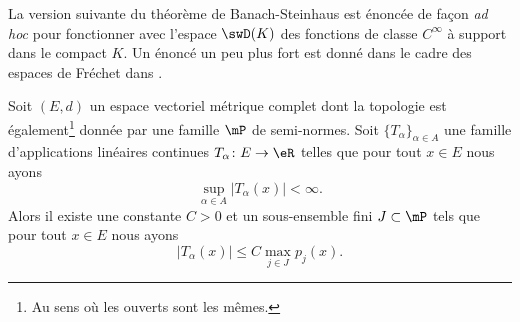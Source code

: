 La version suivante du théorème de Banach-Steinhaus est énoncée de façon \emph{ad hoc} pour fonctionner avec l'espace \( \swD(K)\) des fonctions de classe \(  C^{\infty}\) à support dans le compact \( K\). Un énoncé un peu plus fort est donné dans le cadre des espaces de Fréchet dans \cite{TQSWRiz}.
\begin{theorem}  \label{ThoNBrmGIg}
    Soit \( (E,d)\) un espace vectoriel métrique complet dont la topologie est également\footnote{Au sens où les ouverts sont les mêmes.} donnée par une famille \( \mP\) de semi-normes. Soit \( \{ T_{\alpha} \}_{\alpha\in A}\) une famille d'applications linéaires continues \( T_{\alpha}\colon E\to \eR\) telles que pour tout \( x\in E\) nous ayons
    \begin{equation}
        \sup_{\alpha\in A}\big| T_{\alpha}(x) \big|<\infty.
    \end{equation}
    Alors il existe une constante \( C>0\) et un sous-ensemble fini \( J\subset \mP\) tels que pour tout \( x\in E\) nous ayons
    \begin{equation}    \label{EqIFNGhtr}
        \big| T_{\alpha} (x)\big|\leq C\max_{j\in J}p_j(x).
    \end{equation}
\end{theorem}

